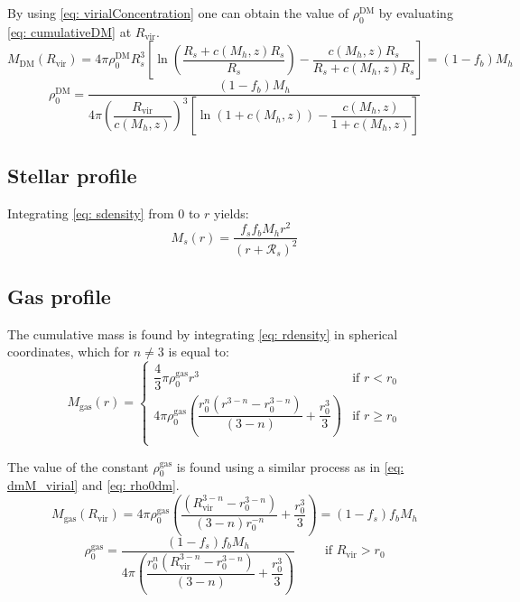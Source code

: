 		By using \autoref{eq: virialConcentration} one can obtain the value of $\rho_0^\text{DM}$ by evaluating \autoref{eq: cumulativeDM} at $R_\text{vir}$.
		\begin{equation}\label{eq: dmM_virial}
		M_\text{DM}(R_\text{vir}) = 4\pi\rho_0^\text{DM}R_s^3 \left[\ln\left(\dfrac{R_s + c(M_h, z)R_s}{R_s}\right) - \dfrac{c(M_h, z)R_s}{R_s + c(M_h, z)R_s}\right] = (1 - f_b)M_h
		\end{equation}
		\begin{equation}\label{eq: rho0dm}
		\rho_0^\text{DM} = \dfrac{(1 - f_b)M_h}{4\pi \left(\dfrac{R_\text{vir}}{c(M_h, z)}\right)^3 \left[\ln\left(1 + c(M_h, z)\right) - \dfrac{c(M_h, z)}{1 + c(M_h, z)}\right]}
		\end{equation}
	
	\subsection{Stellar profile}		
		Integrating \autoref{eq: sdensity} from $0$ to $r$ yields:
		\begin{equation}
			M_s(r) = \dfrac{f_sf_bM_h r^2}{(r + \mathcal{R}_s)^2}
		\end{equation}
	
	\subsection{Gas profile}		
		The cumulative mass is found by integrating \autoref{eq: rdensity} in spherical coordinates, which for $n \neq 3$ is equal to:
		\begin{equation}
			M_\text{gas}(r) = \left \{
			\begin{matrix}
			\dfrac{4}{3}\pi\rho_0^\text{gas}r^3 & \text{if $r < r_0$} \\
			4\pi\rho_0^\text{gas}\left(\dfrac{r_0^{n}\left(r^{3 - n} - r_0^{3 - n}\right)}{(3 - n)}  + \dfrac{r_0^3}{3}\right) & \text{if $r \geq r_0$} \\
			\end{matrix}
			\right.
		\end{equation}
		
		The value of the constant $\rho_0^\text{gas}$ is found using a similar process as in \autoref{eq: dmM_virial} and \ref{eq: rho0dm}.
		\begin{equation}
			M_\text{gas}(R_\text{vir}) = 4\pi\rho_0^\text{gas}\left(\dfrac{\left(R_\text{vir}^{3 - n} - r_0^{3 - n}\right)}{(3-n)r_0^{-n}} + \dfrac{r_0^3}{3}\right) = (1 - f_s) f_bM_h
		\end{equation}
		\begin{equation}
			\rho_0^\text{gas} = \dfrac{(1 - f_s) f_bM_h}{4\pi \left(\dfrac{r_0^{n}\left(R_\text{vir}^{3 - n} - r_0^{3 - n}\right)}{(3 - n)} + \dfrac{r_0^3}{3}\right)} \qquad \text{ if $R_\text{vir} > r_0$}
		\end{equation}
		

